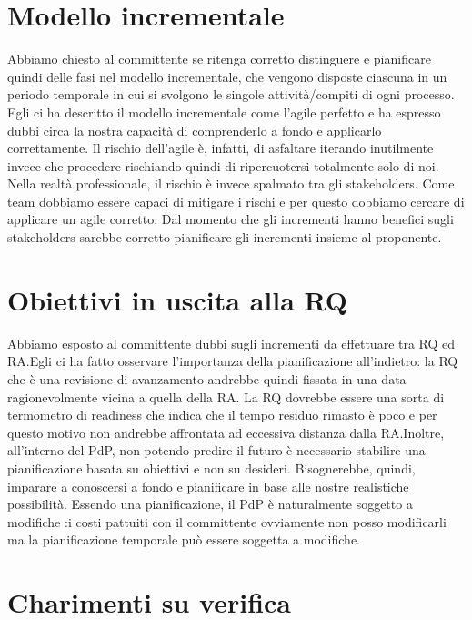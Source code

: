 \documentclass{article}
\begin{document}
\section{Modello incrementale}%
\label{sec:modello_incrementale}

Abbiamo chiesto al committente se ritenga corretto distinguere e pianificare quindi delle fasi nel modello incrementale, che vengono disposte ciascuna in un periodo temporale in cui si svolgono le singole attività/compiti di ogni processo. Egli ci ha descritto il modello incrementale come l'agile perfetto e ha espresso dubbi circa la nostra capacità di comprenderlo a fondo e applicarlo correttamente. Il rischio dell'agile è, infatti, di asfaltare iterando inutilmente invece che procedere rischiando quindi di ripercuotersi totalmente solo di noi. Nella realtà professionale, il rischio è invece spalmato tra gli stakeholders. Come team dobbiamo essere capaci di mitigare i rischi e per questo dobbiamo cercare di applicare un agile corretto. Dal momento che gli incrementi hanno benefici sugli stakeholders sarebbe corretto pianificare gli incrementi insieme al proponente. 

\section{Obiettivi in uscita alla RQ}%
\label{sec:obiettivi_in_uscita_alla_RQ}

Abbiamo esposto al committente dubbi sugli incrementi da effettuare tra RQ ed RA.Egli ci ha fatto osservare l'importanza della pianificazione all'indietro: la RQ che è una revisione di avanzamento andrebbe quindi fissata in una data ragionevolmente vicina a quella della RA. La RQ dovrebbe essere una sorta di termometro di readiness che indica che il tempo residuo rimasto è poco e per questo motivo non andrebbe affrontata ad eccessiva distanza dalla RA.Inoltre, all'interno del PdP, non potendo predire il futuro è necessario stabilire una pianificazione basata su obiettivi e non su desideri. Bisognerebbe, quindi, imparare a conoscersi a fondo e pianificare in base alle nostre realistiche possibilità. Essendo una pianificazione, il PdP è naturalmente soggetto a modifiche :i costi pattuiti con il committente ovviamente non posso modificarli ma la pianificazione temporale può essere soggetta a modifiche.

\section{Charimenti su verifica}%
\label{sec:chiarimenti_su_verifica}
\end{document}
